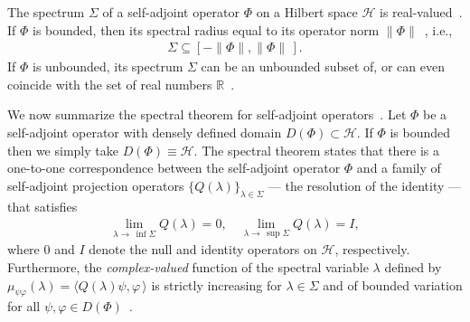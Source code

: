 \documentclass[leqno,onefignum,onetabnum]{siamltex1213}
\newcommand{\Hs}{\mathscr{H}}
\begin{document}
The spectrum $\Sigma$ of a self-adjoint operator $\Phi$ on a Hilbert space
$\Hs$ is real-valued~\cite{Reed-1980,Stone:64}. If $\Phi$ is bounded,
then its spectral radius equal to its operator norm
$\|\Phi\|$~\cite{Reed-1980}, i.e., 
%
\begin{align}\label{eq:Spectral_Radius_Phi}
  \Sigma\subseteq[-\|\Phi\|,\|\Phi\|\,].
\end{align}
%
If $\Phi$ is unbounded, its spectrum $\Sigma$ can be an unbounded subset of,
or can even coincide with the set of real numbers
$\mathbb{R}$~\cite{Stone:64}.




We now summarize the spectral theorem for self-adjoint
operators~\cite{Stone:64}. Let $\Phi$ be a self-adjoint operator with
densely defined domain $D(\Phi)\subset\Hs$. If $\Phi$ is bounded
then we simply take $D(\Phi)\equiv\Hs$. The spectral theorem states that 
there is a one-to-one correspondence between the self-adjoint
operator $\Phi$ and a family of self-adjoint projection operators
$\{Q(\lambda)\}_{\lambda\in\Sigma}$ --- the resolution of the identity --- that
satisfies~\cite{Stone:64} 
%
\begin{align}\label{eq:Res_Identity_limits}
  \lim_{\lambda\to\,\inf{\Sigma}}Q(\lambda)=0, \quad
  \lim_{\lambda\to\,\sup{\Sigma}}Q(\lambda)=I,
\end{align}
%
where $0$ and $I$ denote the null and identity operators on $\Hs$,
respectively. Furthermore, the \emph{complex-valued} function of the
spectral variable $\lambda$ defined by $\mu_{\psi\varphi}(\lambda)=\langle Q(\lambda)\psi,\varphi\,\rangle$ is strictly 
increasing for $\lambda\in\Sigma$ and of bounded variation for all
$\psi,\varphi\in D(\Phi)$~\cite{Stone:64}.
\end{document}
